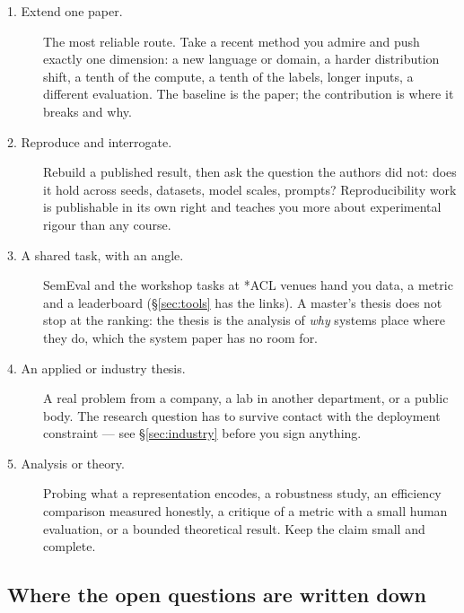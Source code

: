 \documentclass[11pt,a4paper]{article}
\begin{document}
\begin{description}
  \item[1. Extend one paper.] The most reliable route. Take a recent method
        you admire and push exactly one dimension: a new language or domain, a
        harder distribution shift, a tenth of the compute, a tenth of the
        labels, longer inputs, a different evaluation. The baseline is the
        paper; the contribution is where it breaks and why.
  \item[2. Reproduce and interrogate.] Rebuild a published result, then ask
        the question the authors did not: does it hold across seeds, datasets,
        model scales, prompts? Reproducibility work is publishable in its own
        right and teaches you more about experimental rigour than any course.
  \item[3. A shared task, with an angle.] SemEval and the workshop tasks at
        \mbox{*ACL} venues hand you data, a metric and a leaderboard
        (\S\ref{sec:tools} has the links). A master's thesis does not stop at
        the ranking: the thesis is the analysis of \emph{why} systems place
        where they do, which the system paper has no room for.
  \item[4. An applied or industry thesis.] A real problem from a company, a
        lab in another department, or a public body. The research question has
        to survive contact with the deployment constraint ---
        see \S\ref{sec:industry} before you sign anything.
  \item[5. Analysis or theory.] Probing what a representation encodes, a
        robustness study, an efficiency comparison measured honestly, a
        critique of a metric with a small human evaluation, or a bounded
        theoretical result. Keep the claim small and complete.
\end{description}

\subsection{Where the open questions are written down}
\end{document}
